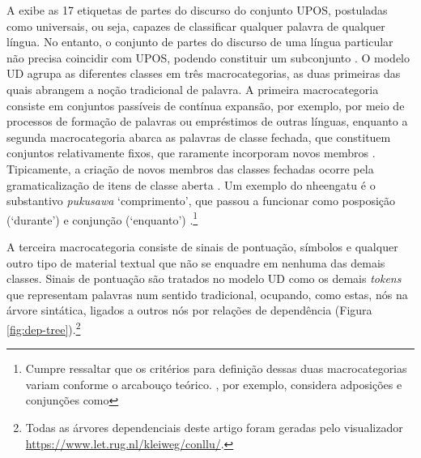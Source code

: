 \documentclass[portuguese]{textolivre}
\newcommand{\wt}[2]{\textit{#1} `#2'}
\begin{document}
A  exibe as 17 etiquetas de partes do discurso do conjunto UPOS, postuladas como universais, ou seja, capazes de classificar qualquer palavra de qualquer língua. No entanto, o conjunto de partes do discurso de uma língua particular não precisa coincidir com UPOS, podendo constituir um subconjunto \parencite{de-marneffe-etal-2021-universal-k}. O modelo UD agrupa as diferentes classes em três macrocategorias, as duas primeiras das quais abrangem a noção tradicional de palavra. A primeira macrocategoria consiste em conjuntos passíveis de contínua expansão, por exemplo, por meio de processos de formação de palavras ou empréstimos de outras línguas, enquanto a segunda macrocategoria abarca as palavras de classe fechada, que constituem conjuntos relativamente fixos, que raramente incorporam novos membros \parencite{jurafsky2009,Lehmann2013-nature}. Tipicamente, a criação de novos membros das classes fechadas ocorre pela gramaticalização de itens de classe aberta \parencite{Lehmann2013-nature}. Um exemplo do nheengatu é o substantivo \wt{pukusawa}{comprimento}, que passou a funcionar como posposição (`durante') e conjunção (`enquanto') \parencite{cruz2011,avila2021}.\footnote{Cumpre ressaltar que os critérios para definição dessas duas macrocategorias variam conforme o arcabouço teórico. \textcite[p. 27]{Lehmann2013-nature}, por exemplo, considera adposições e conjunções como } 

A terceira macrocategoria consiste de sinais de pontuação, símbolos e qualquer outro tipo de material textual que não se enquadre em nenhuma das demais classes. Sinais de pontuação são tratados no modelo UD como os demais \textit{tokens} que representam palavras num sentido tradicional, ocupando, como estas, nós na árvore sintática, ligados a outros nós por relações de dependência (Figura \ref{fig:dep-tree}).\footnote{Todas as árvores dependenciais deste artigo foram geradas pelo visualizador \url{https://www.let.rug.nl/kleiweg/conllu/}.} 
\end{document}

